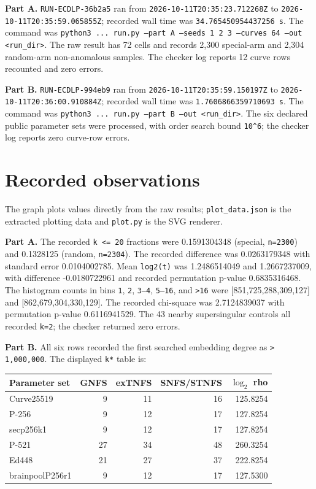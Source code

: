 \documentclass[10pt]{article}
\newcommand{\code}[1]{\texttt{\small #1}}
\begin{document}
\textbf{Part A.} \code{RUN-ECDLP-36b2a5} ran from
\code{2026-10-11T20:35:23.712268Z} to
\code{2026-10-11T20:35:59.065855Z}; recorded wall time was
\code{34.765450954437256 s}. The command was
\code{python3 ... run.py --part A --seeds 1 2 3 --curves 64 --out <run\_dir>}.
The raw result has 72 cells and records 2,300 special-arm and 2,304 random-arm
non-anomalous samples. The checker log reports 12 curve rows recounted and zero
errors.

\textbf{Part B.} \code{RUN-ECDLP-994eb9} ran from
\code{2026-10-11T20:35:59.150197Z} to
\code{2026-10-11T20:36:00.910884Z}; recorded wall time was
\code{1.7606866359710693 s}. The command was
\code{python3 ... run.py --part B --out <run\_dir>}.
The six declared public parameter sets were processed, with order search bound
\code{10^6}; the checker log reports zero curve-row errors.

\section*{Recorded observations}
The graph plots values directly from the raw results; \code{plot\_data.json} is
the extracted plotting data and \code{plot.py} is the SVG renderer.

\textbf{Part A.} The recorded \code{k <= 20} fractions were 0.1591304348
(special, \code{n=2300}) and 0.1328125 (random, \code{n=2304}). The recorded
difference was 0.0263179348 with standard error 0.0104002785. Mean
\code{log2(t)} was 1.2486514049 and 1.2667237009, with difference
-0.0180722961 and recorded permutation p-value 0.6835316468. The histogram
counts in bins \code{1}, \code{2}, \code{3--4}, \code{5--16}, and \code{>16}
were [851,725,288,309,127] and [862,679,304,330,129]. The recorded
chi-square was 2.7124839037 with permutation p-value 0.6116941529. The 43
nearby supersingular controls all recorded \code{k=2}; the checker returned
zero errors.

\textbf{Part B.} All six rows recorded the first searched embedding degree as
\code{> 1,000,000}. The displayed \code{k*} table is:

\begin{center}
\begin{tabular}{lrrrr}
\toprule
Parameter set & GNFS & exTNFS & SNFS/STNFS & $\log_2$ rho\\
\midrule
Curve25519 & 9 & 11 & 16 & 125.8254\\
P-256 & 9 & 12 & 17 & 127.8254\\
secp256k1 & 9 & 12 & 17 & 127.8254\\
P-521 & 27 & 34 & 48 & 260.3254\\
Ed448 & 21 & 27 & 37 & 222.8254\\
brainpoolP256r1 & 9 & 12 & 17 & 127.5300\\
\bottomrule
\end{tabular}
\end{center}
\end{document}
